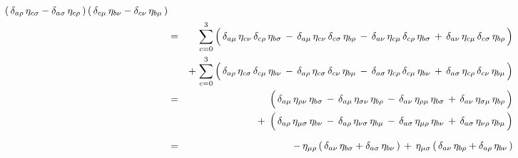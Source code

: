 \begin{enumerate}
\begin{eqnarray*}
		\left(\,%
			\delta_{a\rho}\,\eta_{c\sigma}
			-
			\delta_{a\sigma}\,\eta_{c\rho}
			\,\right)
		\left(\,%
			\delta_{c\mu}\,\eta_{b\nu}
			-
			\delta_{c\nu}\,\eta_{b\mu}
			\,\right)
	\\
	& = &
		{\color{white}+}\;
		\overset{3}{\underset{c=0}{\sum}}
		\left(\,
			\delta_{a\mu}\,\eta_{c\nu}\,\delta_{c\rho}\,\eta_{b\sigma}
			\,\overset{{\color{white}.}}{-}\,
			\delta_{a\mu}\,\eta_{c\nu}\,\delta_{c\sigma}\,\eta_{b\rho}
			\,-\,
			\delta_{a\nu}\,\eta_{c\mu}\,\delta_{c\rho}\,\eta_{b\sigma}
			\,+\,
			\delta_{a\nu}\,\eta_{c\mu}\,\delta_{c\sigma}\,\eta_{b\rho}
			\,\right)
	\\
	&&
		+\;
		\overset{3}{\underset{c=0}{\sum}}
		\left(\,
			\delta_{a\rho}\,\eta_{c\sigma}\,\delta_{c\mu}\,\eta_{b\nu}
			\,\overset{{\color{white}.}}{-}\,
			\delta_{a\rho}\,\eta_{c\sigma}\,\delta_{c\nu}\,\eta_{b\mu}
			\,-\,
			\delta_{a\sigma}\,\eta_{c\rho}\,\delta_{c\mu}\,\eta_{b\nu}
			\,+\,
			\delta_{a\sigma}\,\eta_{c\rho}\,\delta_{c\nu}\,\eta_{b\mu}
			\,\right)
	\\
	& = &
		{\color{white}+}\;
		\left(\,
			\delta_{a\mu}\,\eta_{\rho\nu}\,\eta_{b\sigma}
			\,\overset{{\color{white}.}}{-}\,
			\delta_{a\mu}\,\eta_{\sigma\nu}\,\eta_{b\rho}
			\,-\,
			\delta_{a\nu}\,\eta_{\rho\mu}\,\eta_{b\sigma}
			\,+\,
			\delta_{a\nu}\,\eta_{\sigma\mu}\,\eta_{b\rho}
			\,\right)
	\\
	& &
		+\;
		\left(\,
			\delta_{a\rho}\,\eta_{\mu\sigma}\,\eta_{b\nu}
			\,\overset{{\color{white}.}}{-}\,
			\delta_{a\rho}\,\eta_{\nu\sigma}\,\eta_{b\mu}
			\,-\,
			\delta_{a\sigma}\,\eta_{\mu\rho}\,\eta_{b\nu}
			\,+\,
			\delta_{a\sigma}\,\eta_{\nu\rho}\,\eta_{b\mu}
			\,\right)
	\\
	& \overset{{\color{white}\textnormal{\large$1$}}}{=} &
		-\,\eta_{\mu\rho}\left(\,
			\delta_{a\nu}\,\eta_{b\sigma}
			+
			\delta_{a\sigma}\,\eta_{b\nu}
			\,\right)
		\,+\,
		\eta_{\mu\sigma}\left(\,
			\delta_{a\nu}\,\eta_{b\rho}
			+
			\delta_{a\rho}\,\eta_{b\nu}
			\,\right)
	\\

\end{eqnarray*}
\end{enumerate}
